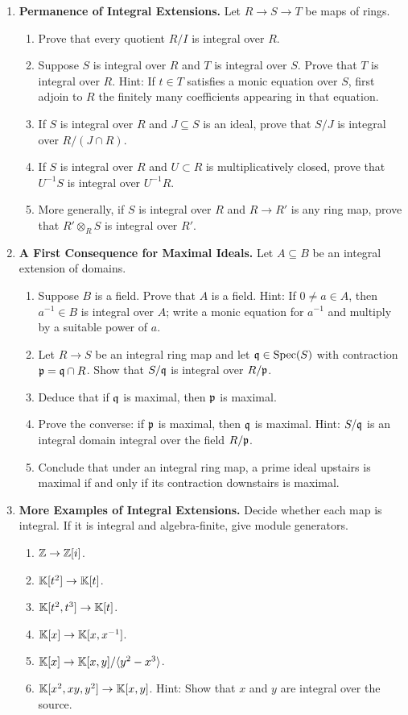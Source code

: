 \documentclass[12pt,reqno]{amsart}
\begin{document}
\begin{enumerate}[leftmargin=*, resume=problems]
\item \textbf{Permanence of Integral Extensions.} Let $R\to S\to T$ be maps of rings.
\begin{enumerate}
    \item Prove that every quotient $R/I$ is integral over $R$.
    \item Suppose $S$ is integral over $R$ and $T$ is integral over $S$. Prove that $T$ is integral over $R$. Hint: If $t\in T$ satisfies a monic equation over $S$, first adjoin to $R$ the finitely many coefficients appearing in that equation.
    \item If $S$ is integral over $R$ and $J\subseteq S$ is an ideal, prove that $S/J$ is integral over $R/(J\cap R)$.
    \item If $S$ is integral over $R$ and $U\subset R$ is multiplicatively closed, prove that $U^{-1}S$ is integral over $U^{-1}R$.
    \item More generally, if $S$ is integral over $R$ and $R\to R'$ is any ring map, prove that $R'\otimes_R S$ is integral over $R'$.
\end{enumerate}

\item \textbf{A First Consequence for Maximal Ideals.} Let $A\subseteq B$ be an integral extension of domains.
\begin{enumerate}
    \item Suppose $B$ is a field. Prove that $A$ is a field. Hint: If $0\neq a\in A$, then $a^{-1}\in B$ is integral over $A$; write a monic equation for $a^{-1}$ and multiply by a suitable power of $a$.
    \item Let $R\to S$ be an integral ring map and let $\mathfrak{q}\in\operatorname{Spec}(S)$ with contraction $\mathfrak{p}=\mathfrak{q}\cap R$. Show that $S/\mathfrak{q}$ is integral over $R/\mathfrak{p}$.
    \item Deduce that if $\mathfrak{q}$ is maximal, then $\mathfrak{p}$ is maximal.
    \item Prove the converse: if $\mathfrak{p}$ is maximal, then $\mathfrak{q}$ is maximal. Hint: $S/\mathfrak{q}$ is an integral domain integral over the field $R/\mathfrak{p}$.
    \item Conclude that under an integral ring map, a prime ideal upstairs is maximal if and only if its contraction downstairs is maximal.
\end{enumerate}

\item \textbf{More Examples of Integral Extensions.} Decide whether each map is integral. If it is integral and algebra-finite, give module generators.
\begin{enumerate}
    \item $\mathbb{Z}\to \mathbb{Z}[i]$.
    \item $\mathbb{K}[t^2]\to \mathbb{K}[t]$.
    \item $\mathbb{K}[t^2,t^3]\to \mathbb{K}[t]$.
    \item $\mathbb{K}[x]\to \mathbb{K}[x,x^{-1}]$.
    \item $\mathbb{K}[x]\to \mathbb{K}[x,y]/\langle y^2-x^3\rangle$.
    \item $\mathbb{K}[x^2,xy,y^2]\to \mathbb{K}[x,y]$. Hint: Show that $x$ and $y$ are integral over the source.
\end{enumerate}


\end{enumerate}
\end{document}
